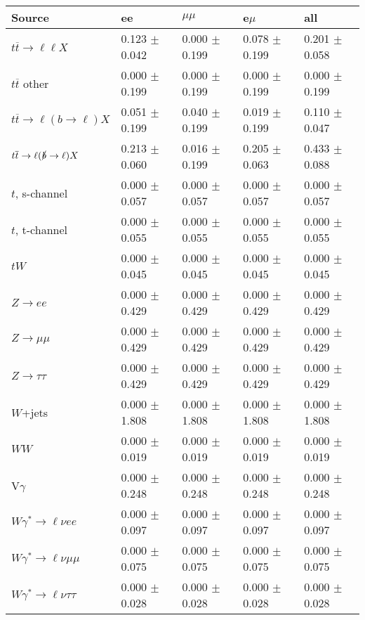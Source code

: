 \begin{tabular}{l | l l l l}
\hline\hline
 Source  &  ee  &  $\mu\mu$  &  e$\mu$  &  all \\
\hline
$t\overline{t}\rightarrow \ell\ell X$ &  0.123 $\pm$  0.042 &  0.000 $\pm$  0.199 &  0.078 $\pm$  0.199 &  0.201 $\pm$  0.058\\
$t\overline{t}$ other &  0.000 $\pm$  0.199 &  0.000 $\pm$  0.199 &  0.000 $\pm$  0.199 &  0.000 $\pm$  0.199\\
$t\overline{t}\rightarrow \ell(b\rightarrow \ell)X$ &  0.051 $\pm$  0.199 &  0.040 $\pm$  0.199 &  0.019 $\pm$  0.199 &  0.110 $\pm$  0.047\\
$t\overline{t}\rightarrow \ell(\slashed{b}\rightarrow \ell)X$ &  0.213 $\pm$  0.060 &  0.016 $\pm$  0.199 &  0.205 $\pm$  0.063 &  0.433 $\pm$  0.088\\
\hline
$t$, s-channel &  0.000 $\pm$  0.057 &  0.000 $\pm$  0.057 &  0.000 $\pm$  0.057 &  0.000 $\pm$  0.057\\
$t$, t-channel &  0.000 $\pm$  0.055 &  0.000 $\pm$  0.055 &  0.000 $\pm$  0.055 &  0.000 $\pm$  0.055\\
$tW$ &  0.000 $\pm$  0.045 &  0.000 $\pm$  0.045 &  0.000 $\pm$  0.045 &  0.000 $\pm$  0.045\\
\hline
$Z\rightarrow ee$ &  0.000 $\pm$  0.429 &  0.000 $\pm$  0.429 &  0.000 $\pm$  0.429 &  0.000 $\pm$  0.429\\
$Z\rightarrow\mu\mu$ &  0.000 $\pm$  0.429 &  0.000 $\pm$  0.429 &  0.000 $\pm$  0.429 &  0.000 $\pm$  0.429\\
$Z\rightarrow\tau\tau$ &  0.000 $\pm$  0.429 &  0.000 $\pm$  0.429 &  0.000 $\pm$  0.429 &  0.000 $\pm$  0.429\\
$W$+jets &  0.000 $\pm$  1.808 &  0.000 $\pm$  1.808 &  0.000 $\pm$  1.808 &  0.000 $\pm$  1.808\\
$WW$ &  0.000 $\pm$  0.019 &  0.000 $\pm$  0.019 &  0.000 $\pm$  0.019 &  0.000 $\pm$  0.019\\
\hline
V$\gamma$ &  0.000 $\pm$  0.248 &  0.000 $\pm$  0.248 &  0.000 $\pm$  0.248 &  0.000 $\pm$  0.248\\
$W\gamma^{*}\rightarrow\ell\nu e e$ &  0.000 $\pm$  0.097 &  0.000 $\pm$  0.097 &  0.000 $\pm$  0.097 &  0.000 $\pm$  0.097\\
$W\gamma^{*}\rightarrow\ell\nu\mu\mu$ &  0.000 $\pm$  0.075 &  0.000 $\pm$  0.075 &  0.000 $\pm$  0.075 &  0.000 $\pm$  0.075\\
$W\gamma^{*}\rightarrow\ell\nu\tau\tau$ &  0.000 $\pm$  0.028 &  0.000 $\pm$  0.028 &  0.000 $\pm$  0.028 &  0.000 $\pm$  0.028\\

\end{tabular}
